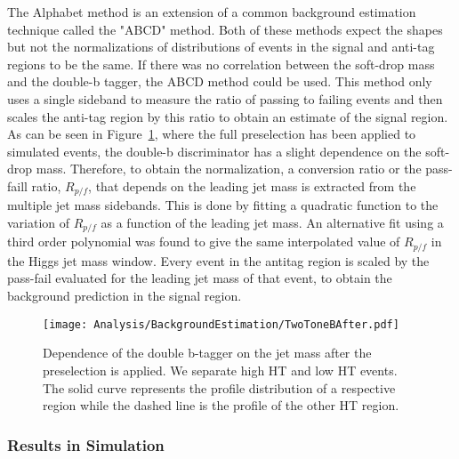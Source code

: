 The Alphabet method is an extension of a common background estimation technique called the "ABCD" method. Both of these methods expect the shapes but not the normalizations of distributions of events in the signal and anti-tag regions to be the same. If there was no correlation between the soft-drop mass and the double-b tagger, the ABCD method could be used. This method only uses a single sideband to measure the ratio of passing to failing events and then scales the anti-tag region by this ratio to obtain an estimate of the signal region. As can be seen in Figure~\ref{fig:twotone2}, where the full preselection has been applied to simulated events, the double-b discriminator has a slight dependence on the soft-drop mass. Therefore, to obtain the normalization, a conversion ratio or the pass-faill ratio, $R_{p/f}$, that depends on the leading jet mass is extracted from the multiple jet mass sidebands. This is done by fitting a quadratic function to the variation of $R_{p/f}$ as a function of the leading jet mass. An alternative fit using a third order polynomial was found to give the same interpolated value of $R_{p/f}$ in the Higgs jet mass window. Every event in the antitag region is scaled by the pass-fail evaluated for the leading jet mass of that event, to obtain the background prediction in the signal region. 

\begin{figure}[H]
  \centering
    \texttt{[image: Analysis/BackgroundEstimation/TwoToneBAfter.pdf]}
  \caption{Dependence of the double b-tagger on the jet mass after the preselection is applied. We separate high HT and low HT events. The solid curve represents the profile distribution of a respective region while the dashed line is the profile of the other HT region.} \label{fig:twotone2}
\end{figure}

\subsubsection{Results in Simulation}

